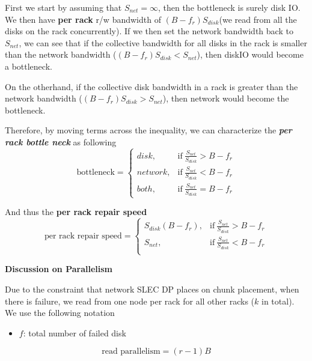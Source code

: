 \documentclass[journal]{IEEEtran}
\begin{document}
First we start by assuming that $S_{net}=\infty$, then the bottleneck is surely disk IO. We then have \textbf{per rack} r/w bandwidth of $(B-f_r)S_{disk}$(we read from all the disks on the rack concurrently). If we then set the network bandwidth back to $S_{net}$, we can see that if the collective bandwidth for all disks in the rack is smaller than the network bandwidth ($(B-f_r)S_{disk}<S_{net}$), then diskIO would become a bottleneck.

On the otherhand, if the collective disk bandwidth in a rack is greater than the network bandwidth ($(B-f_r)S_{disk}>S_{net}$), then network would become the bottleneck.

Therefore, by moving terms across the inequality, we can characterize the \textbf{\textit{per rack bottle neck}} as following
\begin{equation*}
  \text{bottleneck}=
  \begin{cases}
    disk, & \text{if}\ \frac{S_{net}}{S_{disk}}>B-f_r \\
    network, & \text{if}\ \frac{S_{net}}{S_{disk}}<B-f_r \\
    both, & \text{if}\ \frac{S_{net}}{S_{disk}}=B-f_r
  \end{cases}
\end{equation*}

And thus the \textbf{per rack repair speed}
\begin{equation*}
  \text{per rack repair speed}=
  \begin{cases}
    S_{disk}(B-f_r), & \text{if}\ \frac{S_{net}}{S_{disk}}>B-f_r \\
    S_{net}, & \text{if}\ \frac{S_{net}}{S_{disk}}<B-f_r \\
  \end{cases}
\end{equation*}

\hspace*{1cm}

\textbf{Discussion on Parallelism}

Due to the constraint that network SLEC DP places on chunk placement, when there is failure, we read from one node per rack for all other racks ($k$ in total). We use the following notation
\begin{itemize}
  \item $f$: total number of failed disk
\end{itemize}

\begin{equation*}
  \text{read parallelism}=(r-1)B
\end{equation*}
\end{document}
